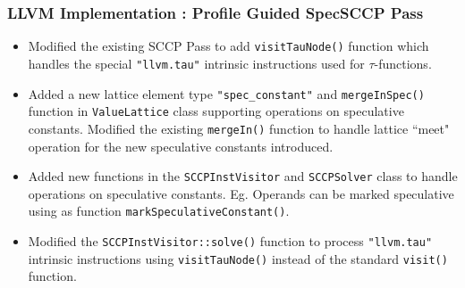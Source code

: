 \documentclass[aspectratio=169, compress]{beamer}
\begin{document}
\begin{frame}
	\frametitle{LLVM Implementation : Profile Guided SpecSCCP Pass}
	\begin{itemize}
		\item Modified the existing SCCP Pass to add \texttt{visitTauNode()} function which handles the special \texttt{"llvm.tau"} intrinsic instructions used for $\tau$-functions.\footnotemark \pause
		\item Added a new lattice element type \texttt{"spec_constant"} and \texttt{mergeInSpec()} function in \texttt{ValueLattice} class supporting operations on speculative constants. Modified the existing \texttt{mergeIn()} function to handle lattice ``meet" operation for the new speculative constants introduced.  \pause
		\item Added new functions in the \texttt{SCCPInstVisitor} and \texttt{SCCPSolver} class to handle operations on speculative constants. Eg. Operands can be marked speculative using as function \texttt{markSpeculativeConstant()}. \pause
		\item Modified the \texttt{SCCPInstVisitor::solve()} function to process \texttt{"llvm.tau"} intrinsic instructions using \texttt{visitTauNode()} instead of the standard \texttt{visit()} function.
	\end{itemize}
	\tiny 
\end{frame}
\end{document}
